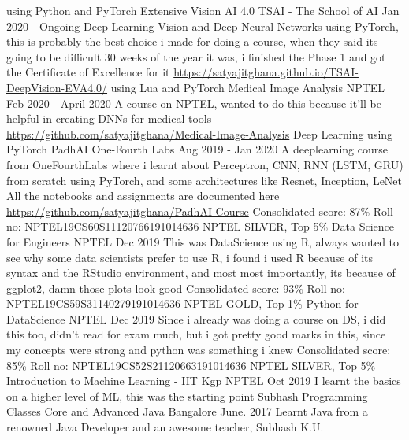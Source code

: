\begin{cventries}
    \cventry
        {using Python and PyTorch}
        {Extensive Vision AI 4.0}
        {TSAI - The School of AI}
        {Jan 2020 - Ongoing}
        {Deep Learning Vision and Deep Neural Networks using PyTorch, this is probably the best
        choice i made for doing a course, when they said its going to be difficult 30 weeks of the year
        it was, i finished the Phase 1 and got the Certificate of Excellence for it \url{https://satyajitghana.github.io/TSAI-DeepVision-EVA4.0/}
        }
    \cventry
        {using Lua and PyTorch}
        {Medical Image Analysis}
        {NPTEL}
        {Feb 2020 - April 2020}
        {A course on NPTEL, wanted to do this because it'll be helpful in creating DNNs for medical tools
        \url{https://github.com/satyajitghana/Medical-Image-Analysis}
        }
    \cventry
        {Deep Learning using PyTorch}
        {PadhAI}
        {One-Fourth Labs}
        {Aug 2019 - Jan 2020}
        {A deeplearning course from OneFourthLabs where i learnt about Perceptron, CNN, RNN (LSTM, GRU) from scratch using PyTorch,
        and some architectures like Resnet, Inception, LeNet
        All the notebooks and assignments are documented here
        \url{https://github.com/satyajitghana/PadhAI-Course}
        }
    \cventry
        {Consolidated score: 87\% Roll no: NPTEL19CS60S11120766191014636 NPTEL SILVER, Top 5\%}
        {Data Science for Engineers}
        {NPTEL}
        {Dec 2019}
        {This was DataScience using R, always wanted to see why some data scientists prefer to use R,
        i found i used R because of its syntax and the RStudio environment, and most most importantly,
        its because of ggplot2, damn those plots look good}
    \cventry
        {Consolidated score: 93\% Roll no: NPTEL19CS59S31140279191014636 NPTEL GOLD, Top 1\%}
        {Python for DataScience}
        {NPTEL}
        {Dec 2019}
        {Since i already was doing a course on DS, i did this too, didn't read for exam much, but i got
        pretty good marks in this, since my concepts were strong and python was something i knew}
    \cventry
        {Consolidated score: 85\% Roll no: NPTEL19CS52S21120663191014636 NPTEL SILVER, Top 5\%}
        {Introduction to Machine Learning - IIT Kgp}
        {NPTEL}
        {Oct 2019}
        {I learnt the basics on a higher level of ML, this was the starting point}
    \cventry
        {Subhash Programming Classes}
        {Core and Advanced Java}
        {Bangalore}
        {June. 2017}
        {Learnt Java from a renowned Java Developer and an awesome teacher, Subhash K.U.}
\end{cventries}